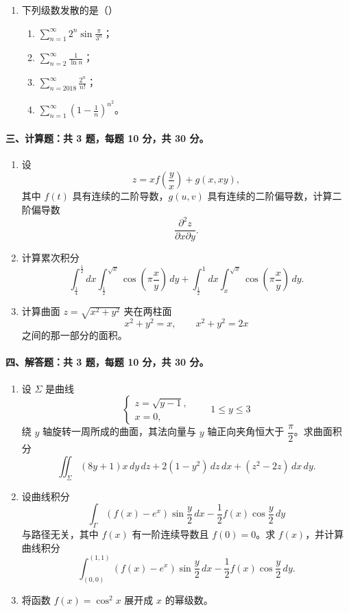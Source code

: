 \begin{enumerate}
  \item 下列级数发散的是（\quad）
  \begin{enumerate}
    \item[A.] $\displaystyle \sum_{n=1}^{\infty}2^n\sin\frac{\pi}{3^n}$；
    \item[B.] $\displaystyle \sum_{n=2}^{\infty}\frac{1}{\ln n}$；
    \item[C.] $\displaystyle \sum_{n=2018}^{\infty}\frac{2^n}{n!}$；
    \item[D.] $\displaystyle \sum_{n=1}^{\infty}\left(1-\frac1n\right)^{n^2}$。
  \end{enumerate}
\end{enumerate}

\paragraph*{三、计算题：共 3 题，每题 10 分，共 30 分。}
\begin{enumerate}
  \item 设
  \[
    z=xf\left(\frac{y}{x}\right)+g(x,xy),
  \]
  其中 $f(t)$ 具有连续的二阶导数，$g(u,v)$ 具有连续的二阶偏导数，计算二阶偏导数
  \[
    \frac{\partial^2 z}{\partial x\partial y}.
  \]

  \item 计算累次积分
  \[
    \int_{\frac14}^{\frac12}dx\int_{\frac12}^{\sqrt{x}}\cos\left(\pi\frac{x}{y}\right)\,dy
    +\int_{\frac12}^{1}dx\int_x^{\sqrt{x}}\cos\left(\pi\frac{x}{y}\right)\,dy.
  \]

  \item 计算曲面 $z=\sqrt{x^2+y^2}$ 夹在两柱面
  \[
    x^2+y^2=x,\qquad x^2+y^2=2x
  \]
  之间的那一部分的面积。
\end{enumerate}

\paragraph*{四、解答题：共 3 题，每题 10 分，共 30 分。}
\begin{enumerate}
  \item 设 $\Sigma$ 是曲线
  \[
    \begin{cases}
      z=\sqrt{y-1},\\
      x=0,
    \end{cases}
    \qquad 1\le y\le 3
  \]
  绕 $y$ 轴旋转一周所成的曲面，其法向量与 $y$ 轴正向夹角恒大于 $\dfrac{\pi}{2}$。求曲面积分
  \[
    \iint_\Sigma (8y+1)x\,dy\,dz+2(1-y^2)\,dz\,dx+(z^2-2z)\,dx\,dy.
  \]

  \item 设曲线积分
  \[
    \int_\Gamma (f(x)-e^x)\sin\frac{y}{2}\,dx-\frac12 f(x)\cos\frac{y}{2}\,dy
  \]
  与路径无关，其中 $f(x)$ 有一阶连续导数且 $f(0)=0$。求 $f(x)$，并计算曲线积分
  \[
    \int_{(0,0)}^{(1,1)}(f(x)-e^x)\sin\frac{y}{2}\,dx-\frac12 f(x)\cos\frac{y}{2}\,dy.
  \]

  \item 将函数 $f(x)=\cos^2x$ 展开成 $x$ 的幂级数。
\end{enumerate}

